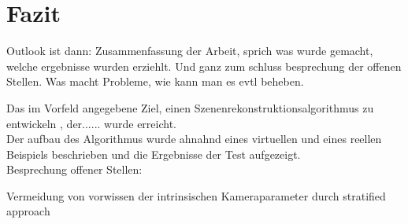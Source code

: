 \chapter{Fazit}


Outlook ist dann: Zusammenfassung der Arbeit, sprich was wurde gemacht, welche ergebnisse wurden erziehlt. Und  ganz zum schluss besprechung der offenen Stellen. Was macht Probleme, wie kann man es evtl beheben.


Das im Vorfeld angegebene Ziel, einen Szenenrekonstruktionsalgorithmus zu entwickeln , der...... wurde erreicht.\\

Der aufbau des Algorithmus wurde ahnahnd eines virtuellen und eines reellen Beispiels beschrieben und die Ergebnisse der Test aufgezeigt.\\














Besprechung offener Stellen:

Vermeidung von vorwissen der intrinsischen Kameraparameter durch stratified approach